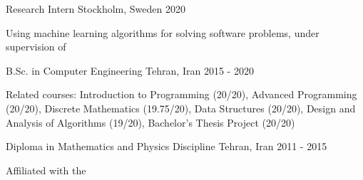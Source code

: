 

\begin{cventries}

  \cventry
    {Research Intern} %
    {} %
    {Stockholm, Sweden} %
    {2020} %
    {
      \begin{cvitems} %
        \item {Using machine learning algorithms for solving software problems, under supervision of }
      \end{cvitems}
    }

  \cventry
    {B.Sc. in Computer Engineering} %
    {} %
    {Tehran, Iran} %
    {2015 - 2020} %
    {
      \begin{cvitems} %
        \item {Related courses: Introduction to Programming (20/20), Advanced Programming (20/20), Discrete Mathematics (19.75/20), \newline Data Structures (20/20), Design and Analysis of Algorithms (19/20), Bachelor's Thesis Project (20/20)}
      \end{cvitems}
    }

  \cventry
    {Diploma in Mathematics and Physics Discipline} %
    {} %
    {Tehran, Iran} %
    {2011 - 2015} %
    {
      \begin{cvitems} %
        \item {Affiliated with the }
      \end{cvitems}
    }

\end{cventries}
